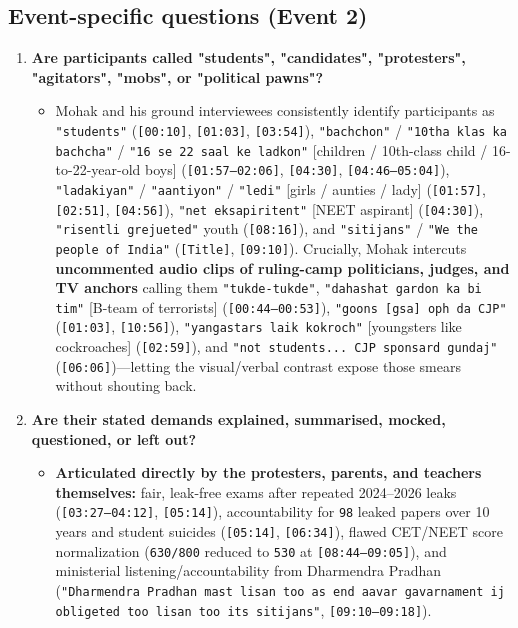 \documentclass[10pt,a4paper]{article}
\begin{document}
\subsection*{Event-specific questions (Event 2)}
\begin{enumerate}[leftmargin=1.6em, itemsep=4pt, topsep=4pt]
  \item \textbf{Are participants called "students", "candidates", "protesters", "agitators", "mobs", or "political pawns"?}
  \begin{itemize}[leftmargin=1.4em, itemsep=2pt, topsep=2pt]
    \item Mohak and his ground interviewees consistently identify participants as \texttt{"students"} (\texttt{[00:10]}, \texttt{[01:03]}, \texttt{[03:54]}), \texttt{"bachchon"} / \texttt{"10tha klas ka bachcha"} / \texttt{"16 se 22 saal ke ladkon"} [children / 10th-class child / 16-to-22-year-old boys] (\texttt{[01:57--02:06]}, \texttt{[04:30]}, \texttt{[04:46--05:04]}), \texttt{"ladakiyan"} / \texttt{"aantiyon"} / \texttt{"ledi"} [girls / aunties / lady] (\texttt{[01:57]}, \texttt{[02:51]}, \texttt{[04:56]}), \texttt{"net eksapiritent"} [NEET aspirant] (\texttt{[04:30]}), \texttt{"risentli grejueted"} youth (\texttt{[08:16]}), and \texttt{"sitijans"} / \texttt{"We the people of India"} (\texttt{[Title]}, \texttt{[09:10]}). Crucially, Mohak intercuts \textbf{uncommented audio clips of ruling-camp politicians, judges, and TV anchors} calling them \texttt{"tukde-tukde"}, \texttt{"dahashat gardon ka bi tim"} [B-team of terrorists] (\texttt{[00:44--00:53]}), \texttt{"goons [gsa] oph da CJP"} (\texttt{[01:03]}, \texttt{[10:56]}), \texttt{"yangastars laik kokroch"} [youngsters like cockroaches] (\texttt{[02:59]}), and \texttt{"not students... CJP sponsard gundaj"} (\texttt{[06:06]})---letting the visual/verbal contrast expose those smears without shouting back.
  \end{itemize}
  \item \textbf{Are their stated demands explained, summarised, mocked, questioned, or left out?}
  \begin{itemize}[leftmargin=1.4em, itemsep=2pt, topsep=2pt]
    \item \textbf{Articulated directly by the protesters, parents, and teachers themselves:} fair, leak-free exams after repeated 2024--2026 leaks (\texttt{[03:27--04:12]}, \texttt{[05:14]}), accountability for \texttt{98} leaked papers over 10 years and student suicides (\texttt{[05:14]}, \texttt{[06:34]}), flawed CET/NEET score normalization (\texttt{630/800} reduced to \texttt{530} at \texttt{[08:44--09:05]}), and ministerial listening/accountability from Dharmendra Pradhan (\texttt{"Dharmendra Pradhan mast lisan too as end aavar gavarnament ij obligeted too lisan too its sitijans"}, \texttt{[09:10--09:18]}).

\end{itemize}
\end{enumerate}
\end{document}
